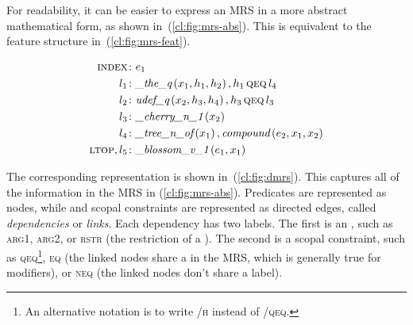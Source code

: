 \documentclass[output=paper,nonflat]{langsci/langscibook}
\begin{document}
For readability, it can be easier to express an MRS
in a more abstract mathematical form, as shown in~(\ref{cl:fig:mrs-abs}).
This is equivalent to the feature structure in~(\ref{cl:fig:mrs-feat}).

\begin{exe}
	\setlength{\abovedisplayskip}{1ex}
	\setlength{\belowdisplayskip}{1ex}
	\ex\label{cl:fig:mrs-abs}
	\begin{minipage}[c]{.6\textwidth}
	\vspace*{-1\baselineskip}
	\begin{align*}
	   \textsc{index}\colon & e_1 \\
		l_1\colon & \textit{\_the\_q}\left(x_1,h_1,h_2\right), h_1 \,\textsc{qeq}\, l_4 \\
		l_2\colon & \textit{udef\_q}\left(x_2,h_3,h_4\right), h_3 \,\textsc{qeq}\, l_3 \\
		l_3\colon & \textit{\_cherry\_n\_1}\left(x_2\right) \\
		l_4\colon & \textit{\_tree\_n\_of}\left(x_1\right), \textit{compound}\left(e_2,x_1,x_2\right) \\
		\textsc{ltop}, l_5\colon & \textit{\_blossom\_v\_1}\left(e_1,x_1\right)
	\end{align*}
	\end{minipage}
\end{exe}

The corresponding 
representation is shown in~(\ref{cl:fig:dmrs}).
This captures all of the information
in the MRS in (\ref{cl:fig:mrs-abs}).
Predicates are represented as nodes,
while  and scopal constraints are represented as directed edges,
called \textit{dependencies} or \textit{links}.
Each dependency has two labels.
The first is an ,
such as \textsc{arg1}, \textsc{arg2},
or \textsc{rstr} (the restriction of a ).
The second is a scopal constraint,
such as \textsc{qeq}\footnote{%
	An alternative notation is to write
	\textsc{/h} instead of \textsc{/qeq}.
},
\textsc{eq} (the linked nodes share a  in the MRS,
which is generally true for modifiers),
or \textsc{neq} (the linked nodes don't share a label).
\end{document}
